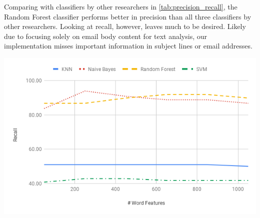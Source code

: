 \documentclass[12pt]{article}
\newenvironment{Figure}
  {\par\medskip\noindent\minipage{\linewidth}}
  {\endminipage\par\medskip}
\begin{document}
\begin{multicols}{2}
                Comparing with classifiers by other researchers in \autoref{tab:precision_recall}, the 
                Random Forest classifier performs better in precision than all three classifiers by other researchers. 
                Looking at recall, however, leaves much to be desired. Likely due to focusing solely on email body 
                content for text analysis, our implementation misses important information in subject lines or 
                email addresses.

    \end{multicols}
        \begin{Figure}
            \centering
            \includegraphics[width=\linewidth]{figures/recall_wv_effect.png}
            \label{fig:recall_word_effect}
        \end{Figure}
\end{document}
